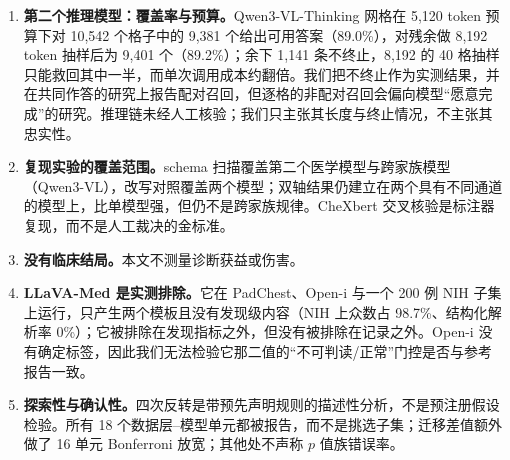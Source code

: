 \begin{enumerate}[leftmargin=1.2em,itemsep=2pt,topsep=2pt]
\item \textbf{第二个推理模型：覆盖率与预算。}Qwen3-VL-Thinking 网格在 5,120 token 预算下对 10,542 个格子中的 9,381 个给出可用答案（89.0\%），对残余做 8,192 token 抽样后为 9,401 个（89.2\%）；余下 1,141 条不终止，8,192 的 40 格抽样只能救回其中一半，而单次调用成本约翻倍。我们把不终止作为实测结果，并在共同作答的研究上报告配对召回，但逐格的非配对召回会偏向模型``愿意完成''的研究。推理链未经人工核验；我们只主张其长度与终止情况，不主张其忠实性。
\item \textbf{复现实验的覆盖范围。}schema 扫描覆盖第二个医学模型与跨家族模型（Qwen3-VL），改写对照覆盖两个模型；双轴结果仍建立在两个具有不同通道的模型上，比单模型强，但仍不是跨家族规律。CheXbert 交叉核验是标注器复现，而不是人工裁决的金标准。
\item \textbf{没有临床结局。}本文不测量诊断获益或伤害。
\item \textbf{LLaVA-Med 是实测排除。}它在 PadChest、Open-i 与一个 200 例 NIH 子集上运行，只产生两个模板且没有发现级内容（NIH 上众数占 98.7\%、结构化解析率 0\%）；它被排除在发现指标之外，但没有被排除在记录之外。Open-i 没有确定标签，因此我们无法检验它那二值的``不可判读/正常''门控是否与参考报告一致。
\item \textbf{探索性与确认性。}四次反转是带预先声明规则的描述性分析，不是预注册假设检验。所有 18 个数据层--模型单元都被报告，而不是挑选子集；迁移差值额外做了 16 单元 Bonferroni 放宽；其他处不声称 $p$ 值族错误率。
\end{enumerate}
